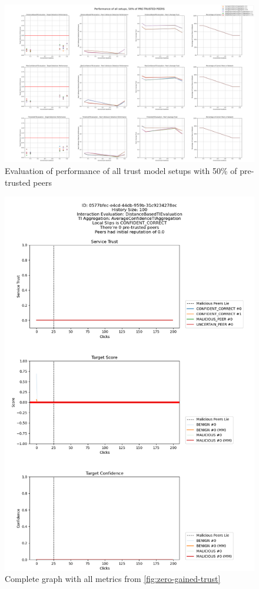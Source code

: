 \begin{figure}
    \centering
    \includegraphics[width=0.9\paperwidth, angle=90]{assets/50_all_metrics.png}
    \caption{Evaluation of performance of all trust model setups with 50\% of pre-trusted peers}
    \label{fig:performance-all-setups-50-pretrusted}
\end{figure}

\begin{figure}
    \centering
    \includegraphics[width=1.0\textwidth]{assets/zero_gained_trust_all.png}
    \caption{Complete graph with all metrics from \ref{fig:zero-gained-trust}}
    \label{fig:zero-gained-trust-all}
\end{figure}

\newpage
